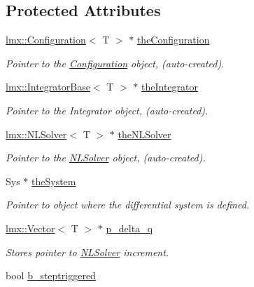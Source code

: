 \subsection*{Protected Attributes}
\begin{DoxyCompactItemize}
\item 
\hyperlink{classlmx_1_1Configuration}{lmx\-::\-Configuration}$<$ T $>$ $\ast$ \hyperlink{classlmx_1_1DiffProblem_a714d81c35c9c8648817dcd58f78d7f66}{the\-Configuration}
\begin{DoxyCompactList}\small\item\em Pointer to the \hyperlink{classlmx_1_1Configuration}{Configuration} object, (auto-\/created). \end{DoxyCompactList}\item 
\hyperlink{classlmx_1_1IntegratorBase}{lmx\-::\-Integrator\-Base}$<$ T $>$ $\ast$ \hyperlink{classlmx_1_1DiffProblem_a5dceac9c803cae5b920048f40f9b889e}{the\-Integrator}
\begin{DoxyCompactList}\small\item\em Pointer to the Integrator object, (auto-\/created). \end{DoxyCompactList}\item 
\hyperlink{classlmx_1_1NLSolver}{lmx\-::\-N\-L\-Solver}$<$ T $>$ $\ast$ \hyperlink{classlmx_1_1DiffProblem_ae6dc037dd9bd8d81235c9ac17d5c6c1a}{the\-N\-L\-Solver}
\begin{DoxyCompactList}\small\item\em Pointer to the \hyperlink{classlmx_1_1NLSolver}{N\-L\-Solver} object, (auto-\/created). \end{DoxyCompactList}\item 
Sys $\ast$ \hyperlink{classlmx_1_1DiffProblem_a9f5d3e07c69d65267b57c42b412705f6}{the\-System}
\begin{DoxyCompactList}\small\item\em Pointer to object where the differential system is defined. \end{DoxyCompactList}\item 
\hyperlink{classlmx_1_1Vector}{lmx\-::\-Vector}$<$ T $>$ $\ast$ \hyperlink{classlmx_1_1DiffProblem_a219c62e356b88d5e2680a476f1c3f427}{p\-\_\-delta\-\_\-q}
\begin{DoxyCompactList}\small\item\em Stores pointer to \hyperlink{classlmx_1_1NLSolver}{N\-L\-Solver} increment. \end{DoxyCompactList}\item 
bool \hyperlink{classlmx_1_1DiffProblem_a3ef615eb960335f2ce95598d3860af07}{b\-\_\-steptriggered}

\end{DoxyCompactItemize}
